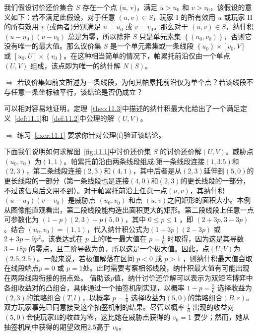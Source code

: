 我们假设讨价还价集合 \(S\) 存在一个点 (u, v)，满足 \(u > {u}_{0}\) 和 \(v > {v}_{0}\)，该假设的意义如下：若不满足此假设，对于任意 \(\left( {u,v}\right)  \in  S\)，玩家 I 的所有效用 \(u\) 或玩家 II 的所有效用 \(v\) (或两者)分别满足 \(u = {u}_{0}\) 或 \(v = {v}_{0}\)。那么对于 \(\left( {u,v}\right)  \in  S\)，纳什积 \(\left( {u - {u}_{0}}\right) \left( {v - {v}_{0}}\right)\) 总是为零，所以除非 \(S\) 只是单元素集 \(\left\{  \left( {{u}_{0},{v}_{0}}\right) \right\}\)，否则它没有唯一的最大值。那么议价集 \(S\) 是一个单元素集或一条线段 \(\left\{  {u}_{0}\right\}   \times  \left\lbrack  {{v}_{0},V}\right\rbrack\) 或 \(\left\lbrack  {{u}_{0},U}\right\rbrack   \times  \left\{  {v}_{0}\right\}\)。在这种相当简单的情况下，帕累托前沿仅由一个单点 $(U,V)$ 组成，该点即为唯一的纳什解 \(N\left( S\right)\)。

\begin{tcolorbox}
\(\Rightarrow\) 若议价集如前文所述为一条线段，为何其帕累托前沿仅为单个点？若该线段不与任意一条坐标轴平行，该结论是否仍成立？
\end{tcolorbox}

可以相对容易地证明，定理~\ref{theo:11.3}中描述的纳什积最大化给出了一个满足定义~\ref{def:11.1}和~\ref{def:11.2}中公理的解 $(U,V)$。

\begin{tcolorbox}
\(\Rightarrow\) 练习~\ref{exer:11.1} 要求你针对公理(f)验证该结论。
\end{tcolorbox}

下面我们说明如何求解图~\ref{fig:11.1}中讨价还价集 \(S\) 的讨价还价解$(U,V)$。威胁点 \(\left( {{u}_{0},{v}_{0}}\right)\) 为$(1,1)$。帕累托前沿由两条线段组成:第一条线段连接$(1,3.5)$和$(2,3)$，第二条线段连接$(2,3)$和$(4,1)$，其中后者是从$(2,3)$延伸到$(5,0)$的更长线段的一部分（第一条线段也是连接$(4,0)$和$(2,3)$的更长线段的一部分，不过该信息后文用不到）。对于帕累托前沿上任意一点$(u,v)$，其纳什积 \(\left( {u - {u}_{0}}\right) \left( {v - {v}_{0}}\right)\) 是威胁点 \(\left( {{u}_{0},{v}_{0}}\right)\) 和点 \((u,v)\)之间矩形的面积大小。本例从图像能直观看出，第二段线段能构造出面积更大的矩形。第二段线段上任意一点可参数化为 \(\left( {1 - p}\right) \left( {2,3}\right)  + p\left( {5,0}\right)\)，其中 \(0 \leq  p \leq  1\) ，即 \(\left( {2 + {3p},3 - {3p}}\right)\)。结合 \(\left( {{u}_{0},{v}_{0}}\right)  = \left( {1,1}\right)\)，代入纳什积公式为\(\left( {1 + {3p}}\right) \left( {2 - {3p}}\right)\) 或 \(2 + {3p} - 9{p}^{2}\)。该表达式在 \(p\) 上的唯一最大值在 \(p = \frac{1}{6}\) 时取得，因为这是其导数 \(3 - {18p}\) 的零点，且二阶导数为负，所以这是一个极大值。因此，点$(U,V)$为$(2.5,2.5)$。一般来说，若极值解落在区间 \(p < 0\) 或 \(p > 1\) ，则纳什积最大值会取在线段端点\(p = 0\) 或 \(p = 1\)处。此时需要考察相邻线段，纳什积最大值有可能出现在两段线段衔接的拐点处。 借助该\(p\)值，纳什讨价还价解可以表示为双矩阵博弈中各组收益对的凸组合，具体通过一个抽签机制实现，以概率 \(1 - p = \frac{5}{6}\) 选择收益为$(2,3)$的策略组合$(T,l)$，以概率 \(p = \frac{1}{6}\) 选择收益为$(5,0)$的策略组合$(B,r)$。双方玩家事先已同意接受这个抽签机制的结果。尽管以概率 \(\frac{1}{6}\) 出现的收益对$(5,0)$会使玩家II的收益为零，这比她在威胁点获得的 \({v}_{0} = 1\) 要少；然而，她从抽签机制中获得的期望效用2.5高于 \({v}_{0}\)。



